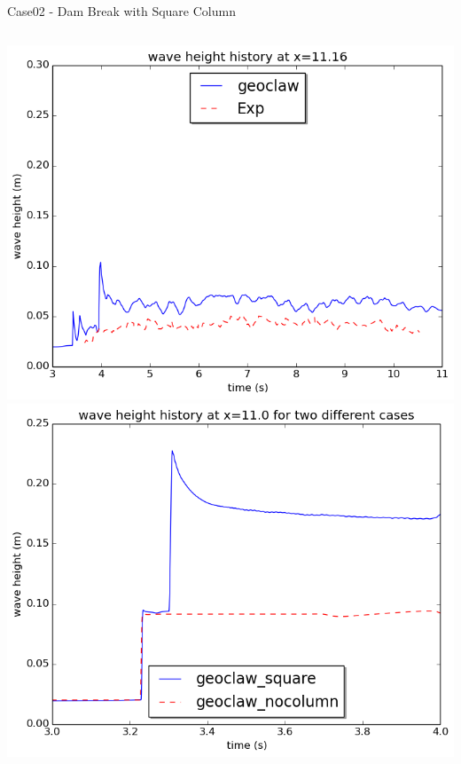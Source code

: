 \documentclass[xcolor=dvipsnames]{beamer}
\begin{document}
\begin{frame}[label=sec-5-5]{Case02 - Dam Break with Square Column}
\begin{columns}
\begin{column}{0.5\textwidth}
\begin{block}{}
\includegraphics[width=.9\linewidth]{../paper/plots/waveheight_square_back.png}  \\
     \includegraphics[width=.9\linewidth]{../paper/plots/waveheight_x11_comparison.png}  \\
\end{block}
\end{column}
\end{columns}
\end{frame}
\end{document}
